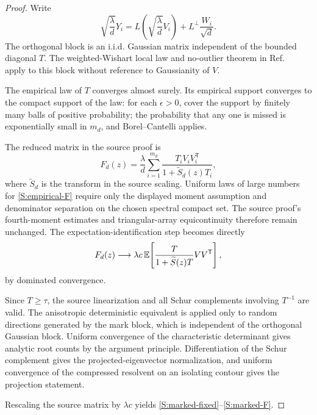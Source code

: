 \documentclass[
  aps,
  prl,
  10pt,
  onecolumn,
  longbibliography,
  nofootinbib
]{revtex4-2}
\theoremstyle{remark}
\begin{document}
\begin{proof}
Write
\begin{equation}
\sqrt{\frac{\lambda}{d}}Y_i
=
L\!\left(\sqrt{\frac{\lambda}{d}}V_i\right)
+
L^\perp\frac{W_i}{\sqrt d}.
\end{equation}
The orthogonal block is an i.i.d. Gaussian matrix independent of the bounded diagonal $T$. The weighted-Wishart local law and no-outlier theorem in Ref.~\cite{BenArousEtAl2025} apply to this block without reference to Gaussianity of $V$.

The empirical law of $T$ converges almost surely. Its empirical support converges to the compact support of the law: for each $\epsilon>0$, cover the support by finitely many balls of positive probability; the probability that any one is missed is exponentially small in $m_d$, and Borel--Cantelli applies.

The reduced matrix in the source proof is
\begin{equation}
F_d(z)
=
\frac{\lambda}{d}
\sum_{i=1}^{m_d}
\frac{T_iV_iV_i^{\mathsf T}}
{1+\widetilde S_d(z)T_i},
\label{S:empirical-F}
\end{equation}
where $\widetilde S_d$ is the transform in the source scaling. Uniform laws of large numbers for \eqref{S:empirical-F} require only the displayed moment assumption and denominator separation on the chosen spectral compact set. The source proof's fourth-moment estimates and triangular-array equicontinuity therefore remain unchanged. The expectation-identification step becomes directly
\begin{equation}
F_d(z)\longrightarrow
\lambda c\,\mathbb{E}\!\left[
\frac{T}{1+\widetilde S(z)T}VV^{\mathsf T}
\right],
\end{equation}
by dominated convergence.

Since $T\ge\tau$, the source linearization and all Schur complements involving $T^{-1}$ are valid. The anisotropic deterministic equivalent is applied only to random directions generated by the mark block, which is independent of the orthogonal Gaussian block. Uniform convergence of the characteristic determinant gives analytic root counts by the argument principle. Differentiation of the Schur complement gives the projected-eigenvector normalization, and uniform convergence of the compressed resolvent on an isolating contour gives the projection statement.

Rescaling the source matrix by $\lambda c$ yields \eqref{S:marked-fixed}--\eqref{S:marked-F}.
\end{proof}
\end{document}
